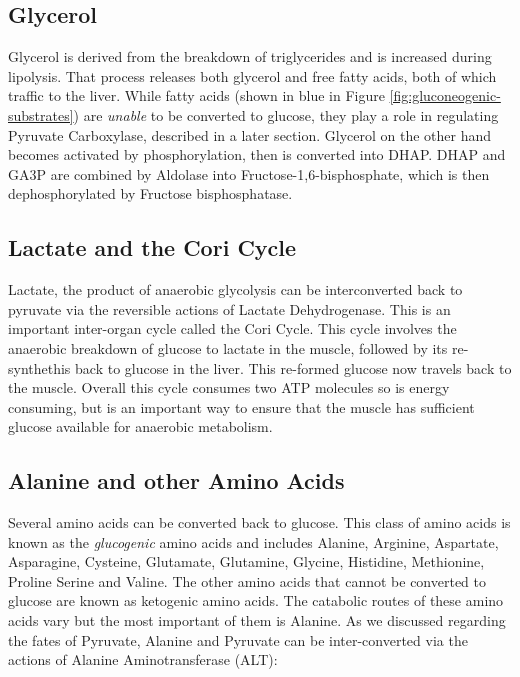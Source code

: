 \documentclass{tufte-handout}
\begin{document}
\subsection{Glycerol}

Glycerol is derived from the breakdown of triglycerides and is increased during lipolysis.  That process releases both glycerol and free fatty acids, both of which traffic to the liver.  While fatty acids (shown in blue in Figure \ref{fig:gluconeogenic-substrates}) are \emph{unable} to be converted to glucose, they play a role in regulating Pyruvate Carboxylase, described in a later section.  Glycerol on the other hand becomes activated by phosphorylation, then is converted into DHAP.  DHAP and GA3P are combined by Aldolase into Fructose-1,6-bisphosphate, which is then dephosphorylated by Fructose bisphosphatase.

\subsection{Lactate and the Cori Cycle}

Lactate, the product of anaerobic glycolysis can be interconverted back to pyruvate via the reversible actions of Lactate Dehydrogenase.  This is an important inter-organ cycle called the Cori Cycle.  This cycle involves the anaerobic breakdown of glucose to lactate in the muscle, followed by its re-synthethis back to glucose in the liver.  This re-formed glucose now travels back to the muscle.  Overall this cycle consumes two ATP molecules so is energy consuming, but is an important way to ensure that the muscle has sufficient glucose available for anaerobic metabolism.

\subsection{Alanine and other Amino Acids}

Several amino acids can be converted back to glucose.  This class of amino acids is known as the \emph{glucogenic} amino acids and includes Alanine, Arginine, Aspartate, Asparagine, Cysteine, Glutamate, Glutamine, Glycine, Histidine, Methionine, Proline Serine and Valine.  The other amino acids that cannot be converted to glucose are known as ketogenic amino acids.  The catabolic routes of these amino acids vary but the most important of them is Alanine. As we discussed regarding the fates of Pyruvate, Alanine and Pyruvate can be inter-converted via the actions of Alanine Aminotransferase (ALT):
\end{document}
